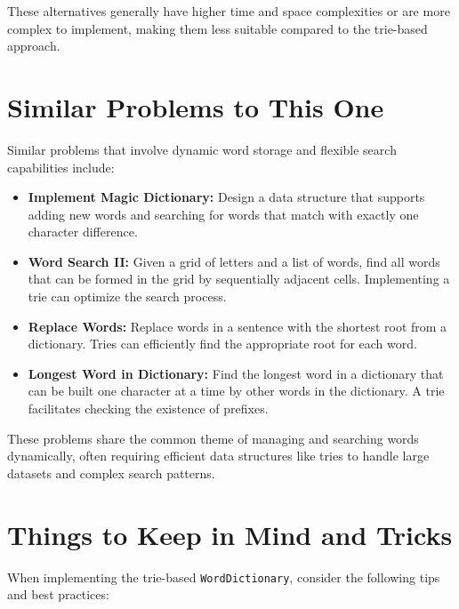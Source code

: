 These alternatives generally have higher time and space complexities or are more complex to implement, making them less suitable compared to the trie-based approach.

\section*{Similar Problems to This One}

Similar problems that involve dynamic word storage and flexible search capabilities include:

\begin{itemize}
    \item \textbf{Implement Magic Dictionary:}  
    Design a data structure that supports adding new words and searching for words that match with exactly one character difference.
    
    \item \textbf{Word Search II:}  
    Given a grid of letters and a list of words, find all words that can be formed in the grid by sequentially adjacent cells. Implementing a trie can optimize the search process.
    
    \item \textbf{Replace Words:}  
    Replace words in a sentence with the shortest root from a dictionary. Tries can efficiently find the appropriate root for each word.
    
    \item \textbf{Longest Word in Dictionary:}  
    Find the longest word in a dictionary that can be built one character at a time by other words in the dictionary. A trie facilitates checking the existence of prefixes.
\end{itemize}

These problems share the common theme of managing and searching words dynamically, often requiring efficient data structures like tries to handle large datasets and complex search patterns.

\section*{Things to Keep in Mind and Tricks}

When implementing the trie-based \texttt{WordDictionary}, consider the following tips and best practices:

